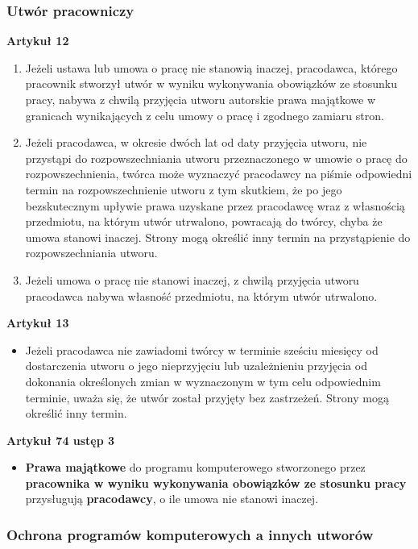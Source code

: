 \documentclass[12pt,a4paper]{article}
\begin{document}
\subsubsection{Utwór pracowniczy}
\textbf{Artykuł 12}
\begin{enumerate}
\item Jeżeli ustawa lub umowa o pracę nie stanowią inaczej, pracodawca, którego pracownik stworzył utwór w wyniku wykonywania obowiązków ze stosunku pracy, nabywa z chwilą przyjęcia utworu autorskie prawa majątkowe w granicach wynikających z celu umowy o pracę i zgodnego zamiaru stron. 
\item Jeżeli pracodawca, w okresie dwóch lat od daty przyjęcia utworu, nie przystąpi do rozpowszechniania utworu przeznaczonego w umowie o pracę do rozpowszechnienia, twórca może wyznaczyć pracodawcy na piśmie odpowiedni termin na rozpowszechnienie utworu z tym skutkiem, że po jego bezskutecznym upływie prawa uzyskane  przez  pracodawcę  wraz  z  własnością  przedmiotu,  na  którym  utwór utrwalono, powracają do twórcy, chyba że umowa stanowi inaczej. Strony mogą określić inny termin na przystąpienie do rozpowszechniania utworu. 
\item Jeżeli umowa o pracę nie stanowi inaczej, z chwilą przyjęcia utworu pracodawca nabywa własność przedmiotu, na którym utwór utrwalono. 
\end{enumerate}
\textbf{Artykuł 13}
\begin{itemize}
\item Jeżeli pracodawca nie zawiadomi twórcy w terminie sześciu miesięcy od dostarczenia utworu o jego nieprzyjęciu lub uzależnieniu przyjęcia od dokonania określonych zmian w wyznaczonym w tym celu odpowiednim terminie, uważa się, że utwór został przyjęty bez zastrzeżeń. Strony mogą określić inny termin. 
\end{itemize}
\textbf{Artykuł 74 ustęp 3}
\begin{itemize}
\item \textbf{Prawa majątkowe} do programu komputerowego stworzonego przez \textbf{pracownika w wyniku wykonywania obowiązków ze stosunku pracy} przysługują \textbf{pracodawcy}, o ile umowa nie stanowi inaczej. 
\end{itemize}


\subsubsection{Ochrona programów komputerowych a innych utworów}
\end{document}
